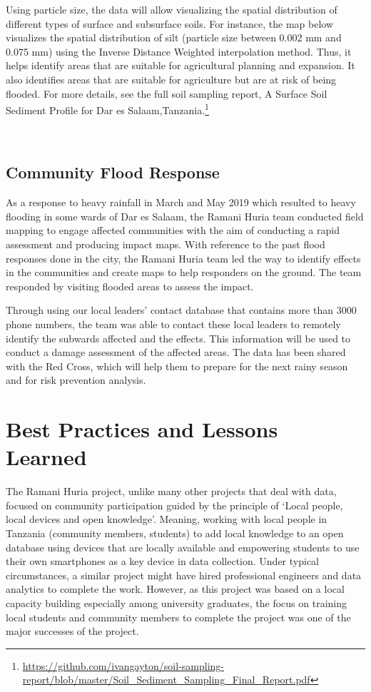 \documentclass[a4paper,12pt,twoside]{article}
\begin{document}
Using particle size, the data will allow visualizing the spatial distribution of different types of surface and subsurface soils. For instance, the map below visualizes the spatial distribution of silt (particle size between 0.002 mm and 0.075 mm) using the Inverse Distance Weighted interpolation method. Thus, it helps identify areas that are suitable for agricultural planning and expansion. It also identifies areas that are suitable for agriculture but are at risk of being flooded. For more details, see the full soil sampling report, A Surface Soil Sediment Profile for Dar es
Salaam,Tanzania.\footnote{\url{https://github.com/ivangayton/soil-sampling-report/blob/master/Soil_Sediment_Sampling_Final_Report.pdf}}

\

\in\in
\subsection{Community Flood Response}

As a response to heavy rainfall in March and May 2019 which resulted to heavy flooding in some wards of Dar es Salaam, the Ramani Huria team conducted field mapping to engage affected communities with the aim of conducting a rapid assessment and producing impact maps. With reference to the past flood responses done in the city, the Ramani Huria team led the way to identify effects in the communities and create maps to help responders on the ground. The team responded by visiting flooded areas to assess the impact.

Through using our local leaders’ contact database that contains more than 3000 phone numbers, the team was able to contact these local leaders to remotely identify the subwards affected and the effects.
This information will be used to conduct a damage assessment of the affected areas. The data has been shared with the Red Cross, which will help them to prepare for the next rainy season and for risk prevention analysis.

\newpage

\section{Best Practices and Lessons Learned}


The Ramani Huria project, unlike many other projects that deal with data, focused on community participation guided by the principle of ‘Local people, local devices and open knowledge'. Meaning,  working with local people in Tanzania (community members, students) to add local knowledge to an open database using devices that are locally available and empowering students to use  their own smartphones as a key device in data collection. Under typical circumstances, a similar project might have hired professional engineers and data analytics to complete the work. However, as this project was based on a local capacity building especially among university graduates, the focus on training local students and community members to complete the project was one of the major successes of the project.
\end{document}
